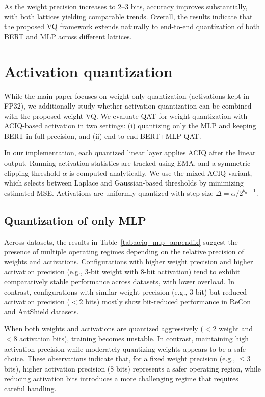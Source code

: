 \documentclass{article}
\theoremstyle{definition}
\theoremstyle{remark}
\begin{document}
As the weight precision increases to 2–3 bits, accuracy improves substantially, with both lattices yielding comparable trends. Overall, the results indicate that the proposed VQ framework extends naturally to end-to-end quantization of both BERT and MLP across different lattices.  

\section{Activation quantization}
While the main paper focuses on weight-only quantization (activations kept in FP32), we additionally study whether activation quantization can be combined with the proposed weight VQ. We evaluate QAT for weight quantization with ACIQ-based\cite{banner2018aciq} activation in two settings: (i) quantizing only the MLP and keeping BERT in full precision, and (ii) end-to-end BERT+MLP QAT.

In our implementation, each quantized linear layer applies ACIQ after the linear output. Running activation statistics are tracked using EMA, and a symmetric clipping threshold $\alpha$ is computed analytically. We use the mixed ACIQ variant, which selects between Laplace and Gaussian-based thresholds by minimizing estimated MSE. Activations are uniformly quantized with step size $\Delta=\alpha/2^{b_a-1}$.

\subsection{Quantization of only MLP}
Across datasets, the results in Table~\ref{tab:aciq_mlp_appendix} suggest the presence of multiple operating regimes depending on the relative precision of weights and activations. 
Configurations with higher weight precision and higher activation precision (e.g., 3-bit weight with 8-bit activation) tend to exhibit comparatively stable performance across datasets, with lower overload. 
In contrast, configurations with similar weight precision (e.g., 3-bit) but reduced activation precision ($<$2 bits) mostly show bit-reduced performance in ReCon and AntShield datasets.

When both weights and activations are quantized aggressively ($<$2 weight and $<8$ activation bits), training becomes unstable. In contrast, maintaining high activation precision while moderately quantizing weights appears to be a safe choice. 
These observations indicate that, for a fixed weight precision (e.g., $\le 3$ bits), higher activation precision (8 bits) represents a safer operating region, while reducing activation bits introduces a more challenging regime that requires careful handling.
\end{document}
